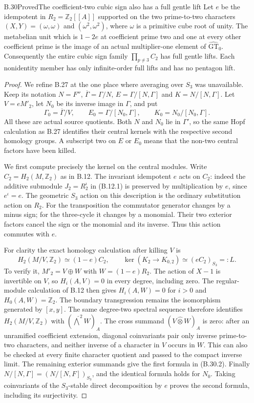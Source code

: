 \begin{statement}{B.30}{Proved}{The coefficient-two cubic sign also has a full gentle lift}
Let $e$ be the idempotent in $R_2=\mathbb Z_2[[A]]$
supported on the two prime-to-two characters
$(X,Y)=(\omega,\omega)$ and $(\omega^2,\omega^2)$,
where $\omega$ is a primitive cube root of unity.
The metabelian unit which is $1-2e$ at coefficient
prime two and one at every other coefficient prime
is the image of an actual multiplier-one element of
$\widehat{\mathrm{GT}}_0$. Consequently the entire
cubic sign family $\prod_{p\ne3}C_2$ has full gentle
lifts. Each nonidentity member has only infinite-order
full lifts and has no pentagon lift.
\end{statement}
\begin{proof}
We refine B.27 at the one place where averaging over
$S_3$ was unavailable. Keep its notation
$N=F''$, $\overline\Gamma=\Gamma/N$,
$E=\Gamma/[N,\Gamma]$ and $K=N/[N,\Gamma]$.
Let $V=eM'_2$, let $N_0$ be its inverse image in
$\Gamma$, and put
\[
 \Gamma_0=\overline\Gamma/V,\qquad
 E_0=\Gamma/[N_0,\Gamma],\qquad
 K_0=N_0/[N_0,\Gamma].
 \tag{B.30.1}
\]
All these are actual source quotients. Both $N$ and
$N_0$ lie in $\Gamma'$, so the same Hopf calculation
as B.27 identifies their central kernels with the
respective second homology groups. A subscript two
on $E$ or $E_0$ means that the non-two central factors
have been killed.

We first compute precisely the kernel on the central
modules. Write $C_2=H_2(M,\mathbb Z_2)$ as in
B.12. The invariant idempotent $e$ acts on $C_2$:
indeed the additive submodule $J_2=R_2^\iota$ in
(B.12.1) is preserved by multiplication by $e$, since
$e^\iota=e$. The geometric $S_3$ action on this
description is the ordinary substitution action on
$R_2$. For the transposition the commutator generator
changes by a minus sign; for the three-cycle it changes
by a monomial. Their two exterior factors cancel the
sign or the monomial and its inverse. Thus this action
commutes with $e$.

For clarity the exact homology calculation after
killing $V$ is
\[
 H_2(M/V,\mathbb Z_2)\simeq(1-e)C_2,
 \qquad
 \ker(K_2\longrightarrow K_{0,2})
             \simeq(eC_2)_{S_3}=:L.
 \tag{B.30.2}
\]
To verify it, $M'_2=V\oplus W$ with
$W=(1-e)R_2$. The action of $X-1$ is invertible
on $V$, so $H_i(A,V)=0$ in every degree, including
zero. The regular-module calculation of B.12 then
gives $H_i(A,W)=0$ for $i>0$ and
$H_0(A,W)=\mathbb Z_2$. The boundary transgression
remains the isomorphism generated by $[x,y]$.
The same degree-two spectral sequence therefore
identifies $H_2(M/V,\mathbb Z_2)$ with
$(\widehat\bigwedge^2 W)_A$.
The cross summand $(V\widehat\otimes W)_A$ is zero:
after an unramified coefficient extension, diagonal
coinvariants pair only inverse prime-to-two
characters, and neither inverse of a character in
$V$ occurs in $W$. This can also be checked at every
finite character quotient and passed to the compact
inverse limit. The remaining exterior summands give
the first formula in (B.30.2).
Finally $N/[N,\Gamma]=(N/[N,F])_{S_3}$, and the
identical formula holds for $N_0$. Taking coinvariants
of the $S_3$-stable direct decomposition by $e$ proves
the second formula, including its surjectivity.


\end{proof}
